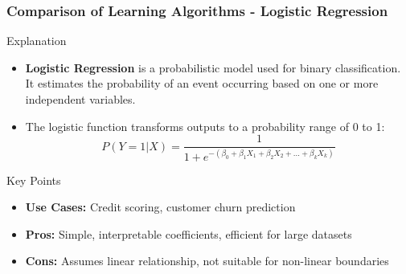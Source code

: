 \documentclass[aspectratio=169]{beamer}
\begin{document}
\begin{frame}[fragile]
    \frametitle{Comparison of Learning Algorithms - Logistic Regression}
    \begin{block}{Explanation}
        \begin{itemize}
            \item \textbf{Logistic Regression} is a probabilistic model used for binary classification. 
            It estimates the probability of an event occurring based on one or more independent variables.
            \item The logistic function transforms outputs to a probability range of 0 to 1:
            \begin{equation}
            P(Y=1|X) = \frac{1}{1 + e^{-(\beta_0 + \beta_1X_1 + \beta_2X_2 + ... + \beta_kX_k)}}
            \end{equation}
        \end{itemize}
    \end{block}
    \begin{block}{Key Points}
        \begin{itemize}
            \item \textbf{Use Cases:} Credit scoring, customer churn prediction 
            \item \textbf{Pros:} Simple, interpretable coefficients, efficient for large datasets 
            \item \textbf{Cons:} Assumes linear relationship, not suitable for non-linear boundaries
        \end{itemize}
    \end{block}
\end{frame}
\end{document}
